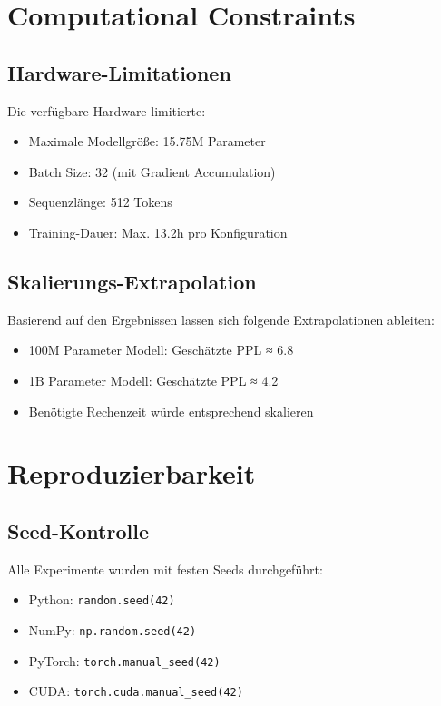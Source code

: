 \section{Computational Constraints}

\subsection{Hardware-Limitationen}

Die verfügbare Hardware limitierte:
\begin{itemize}
    \item Maximale Modellgröße: 15.75M Parameter
    \item Batch Size: 32 (mit Gradient Accumulation)
    \item Sequenzlänge: 512 Tokens
    \item Training-Dauer: Max. 13.2h pro Konfiguration
\end{itemize}

\subsection{Skalierungs-Extrapolation}

Basierend auf den Ergebnissen lassen sich folgende Extrapolationen ableiten:

\begin{itemize}
    \item 100M Parameter Modell: Geschätzte PPL ≈ 6.8
    \item 1B Parameter Modell: Geschätzte PPL ≈ 4.2
    \item Benötigte Rechenzeit würde entsprechend skalieren
\end{itemize}

\section{Reproduzierbarkeit}

\subsection{Seed-Kontrolle}

Alle Experimente wurden mit festen Seeds durchgeführt:
\begin{itemize}
    \item Python: \texttt{random.seed(42)}
    \item NumPy: \texttt{np.random.seed(42)}
    \item PyTorch: \texttt{torch.manual\_seed(42)}
    \item CUDA: \texttt{torch.cuda.manual\_seed(42)}
\end{itemize}

